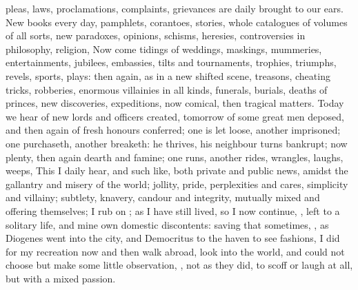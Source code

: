 pleas, laws, proclamations, complaints, grievances are daily brought to our
ears. New books every day, pamphlets, corantoes, stories, whole catalogues of
volumes of all sorts, new paradoxes, opinions, schisms, heresies, controversies
in philosophy, religion, \etc{} Now come tidings of weddings, maskings,
mummeries, entertainments, jubilees, embassies, tilts and tournaments,
trophies, triumphs, revels, sports, plays: then again, as in a new shifted
scene, treasons, cheating tricks, robberies, enormous villainies in all kinds,
funerals, burials, deaths of princes, new discoveries, expeditions, now
comical, then tragical matters. Today we hear of new lords and officers
created, tomorrow of some great men deposed, and then again of fresh honours
conferred; one is let loose, another imprisoned; one purchaseth, another
breaketh: he thrives, his neighbour turns bankrupt; now plenty, then again
dearth and famine; one runs, another rides, wrangles, laughs, weeps, \etc{}
This I daily hear, and such like, both private and public news, amidst the
gallantry and misery of the world; jollity, pride, perplexities and cares,
simplicity and villainy; subtlety, knavery, candour and integrity, mutually
mixed and offering themselves; I rub on ; as I have still lived, so I now continue, , left
to a solitary life, and mine own domestic discontents: saving that sometimes,
, as Diogenes went into the city,
and Democritus to the haven to see fashions, I did for my recreation now and
then walk abroad, look into the world, and could not choose but make some
little observation, , not as they did, to scoff or laugh at all, but
with a mixed passion.


